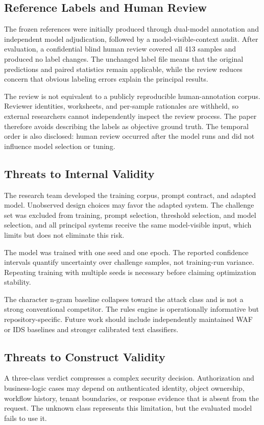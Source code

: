 \subsection{Reference Labels and Human Review}
The frozen references were initially produced through dual-model annotation and independent model adjudication, followed by a model-visible-context audit. After evaluation, a confidential blind human review covered all 413 samples and produced no label changes. The unchanged label file means that the original predictions and paired statistics remain applicable, while the review reduces concern that obvious labeling errors explain the principal results.

The review is not equivalent to a publicly reproducible human-annotation corpus. Reviewer identities, worksheets, and per-sample rationales are withheld, so external researchers cannot independently inspect the review process. The paper therefore avoids describing the labels as objective ground truth. The temporal order is also disclosed: human review occurred after the model runs and did not influence model selection or tuning.

\subsection{Threats to Internal Validity}
The research team developed the training corpus, prompt contract, and adapted model. Unobserved design choices may favor the adapted system. The challenge set was excluded from training, prompt selection, threshold selection, and model selection, and all principal systems receive the same model-visible input, which limits but does not eliminate this risk.

The model was trained with one seed and one epoch. The reported confidence intervals quantify uncertainty over challenge samples, not training-run variance. Repeating training with multiple seeds is necessary before claiming optimization stability.

The character n-gram baseline collapses toward the attack class and is not a strong conventional competitor. The rules engine is operationally informative but repository-specific. Future work should include independently maintained WAF or IDS baselines and stronger calibrated text classifiers.

\subsection{Threats to Construct Validity}
A three-class verdict compresses a complex security decision. Authorization and business-logic cases may depend on authenticated identity, object ownership, workflow history, tenant boundaries, or response evidence that is absent from the request. The unknown class represents this limitation, but the evaluated model fails to use it.

